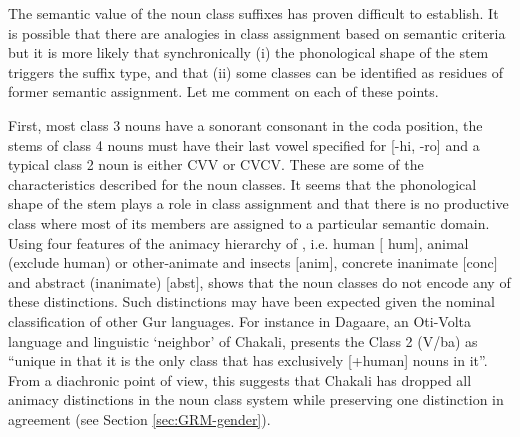 \begin{exe}
\begin{exe}
\begin{exe}
{\begin{exe}
\begin{exe}
\begin{exe}
\begin{exe}
The semantic value of the noun class suffixes has proven difficult to
establish. It is possible that there are analogies in class assignment based on
semantic criteria but it is more likely that synchronically (i) the phonological
shape of the stem triggers the suffix type, and that (ii) some classes can be
identified as residues of former semantic assignment. Let me comment on each of 
these
points. 

First, most class 3 nouns have  a sonorant consonant in the coda position,
the stems of  class 4 nouns must have their last vowel specified for  [{\sc -hi,
-ro}] and a typical class 2 noun is either   CVV or CVCV.  These are some of
the characteristics  described for the noun classes. It seems that the
phonological
shape of the stem plays a role in class assignment and that there is no
productive class
where most of its  members are assigned to a particular semantic domain.  Using
four features of the animacy hierarchy
of  \citet{Comr89}, i.e.  human $[${\sc
hum}$]$, animal (exclude human) or other-animate
and insects $[${\sc anim}$]$, concrete inanimate $[${\sc conc}$]$ and abstract
(inanimate) $[${\sc abst}$]$,  \citet{brin08} shows that the noun
classes  do not encode any of these distinctions. Such
distinctions may have
been  expected given the nominal classification of other Gur languages. For
instance in Dagaare, an Oti-Volta language and linguistic `neighbor' of
Chakali, \citet[124]{Bodo94} presents the Class 2 (V/ba) as ``unique in that it
is the only class that has exclusively [+human] nouns in it''. From a
diachronic point of view, this suggests that Chakali has dropped all animacy
distinctions in the noun class system while preserving one distinction in
agreement (see Section \ref{sec:GRM-gender}).



\end{exe}
\end{exe}
\end{exe}
\end{exe}}
\end{exe}
\end{exe}
\end{exe}
